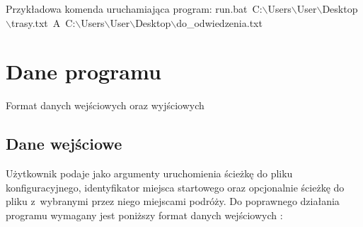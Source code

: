 \documentclass[10pt,oneside]{article}
\begin{document}
Przykładowa komenda uruchamiająca program:
\newline
run.bat~C:$\backslash$Users$\backslash$User$\backslash$Desktop$\backslash$trasy.txt~A~C:$\backslash$Users$\backslash$User$\backslash$Desktop$\backslash$do\_odwiedzenia.txt

\section{Dane programu}
Format danych wejściowych oraz wyjściowych
\subsection{Dane wejściowe}
Użytkownik podaje jako argumenty uruchomienia ścieżkę do pliku konfiguracyjnego, identyfikator miejsca startowego oraz opcjonalnie ścieżkę do pliku z~wybranymi przez niego miejscami podróży.
Do poprawnego działania programu wymagany jest poniższy format danych wejściowych :
\end{document}
